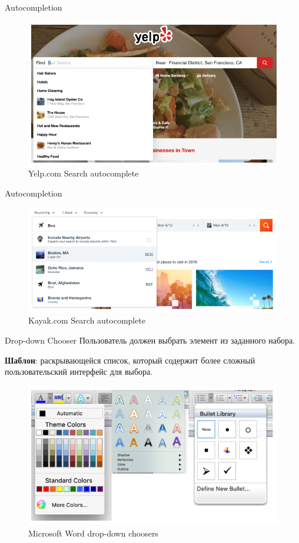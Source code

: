 \documentclass{beamer}
\begin{document}
\begin{frame}[t]{Autocompletion}
	\begin{figure}[h]
		\centering
		\includegraphics[scale=0.6]{images/lec08-pic54.png}
		\caption{Yelp.com Search autocomplete}
	\end{figure}
\end{frame}

\begin{frame}[t]{Autocompletion}
	\begin{figure}[h]
		\centering
		\includegraphics[scale=0.6]{images/lec08-pic55.png}
		\caption{ Kayak.com Search autocomplete}
	\end{figure}
\end{frame}

\begin{frame}[t]{Drop-down Chooser}
	Пользователь должен выбрать элемент из заданного набора.
	
	\textbf{Шаблон}: раскрывающейся список, который содержит более сложный пользовательский интерфейс для выбора.
	\begin{figure}[h]
		\centering
		\includegraphics[scale=0.5]{images/lec08-pic56.png}
		\caption{Microsoft Word drop-down choosers}
	\end{figure}
\end{frame}
\end{document}
